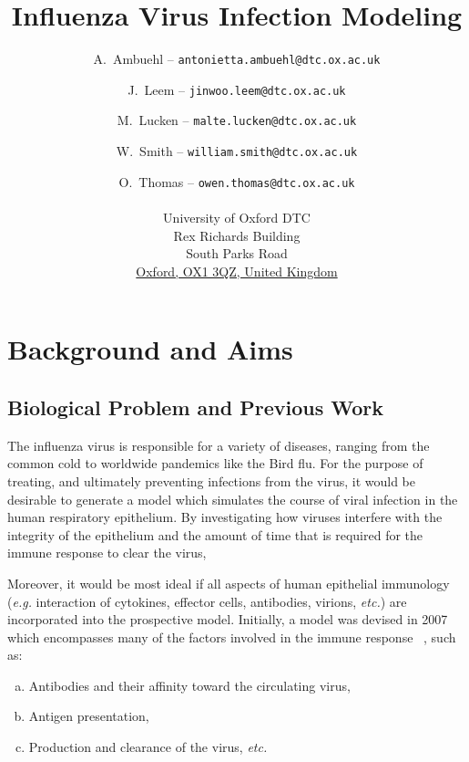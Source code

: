 \documentclass[a4paper, 12pt]{report}
\title{Influenza Virus Infection Modeling}
\author{A.~Ambuehl -- \texttt{antonietta.ambuehl@dtc.ox.ac.uk} \and J.~Leem -- \texttt{jinwoo.leem@dtc.ox.ac.uk} \and M.~Lucken -- \texttt{malte.lucken@dtc.ox.ac.uk} \and W.~Smith -- \texttt{william.smith@dtc.ox.ac.uk} \and O.~Thomas -- \texttt{owen.thomas@dtc.ox.ac.uk} \\\\
University of Oxford DTC \\
Rex Richards Building \\
South Parks Road\\
\underline{Oxford, OX1 3QZ, United Kingdom}\\
}
\begin{document}
\maketitle

%

\chapter{Background and Aims} %
\section{Biological Problem and Previous Work}
The influenza virus is responsible for a variety of diseases, ranging from the common cold to worldwide pandemics like the Bird flu. For the purpose of treating, and ultimately preventing infections from the virus, it would be desirable to generate a model which simulates the course of viral infection in the human respiratory epithelium. By investigating how viruses interfere with the integrity of the epithelium and the amount of time that is required for the immune response to clear the virus, 

Moreover, it would be most ideal if all aspects of human epithelial immunology (\emph{e.g.} interaction of cytokines, effector cells, antibodies, virions, \emph{etc.}) are incorporated into the prospective model. Initially, a model was devised in 2007 which encompasses many of the factors involved in the immune response ~\cite{Hancioglu}, such as:
\begin{enumerate}[a.]
\item Antibodies and their affinity toward the circulating virus,
\item Antigen presentation,
\item Production and clearance of the virus, \emph{etc.}
\end{enumerate}

\end{document}

